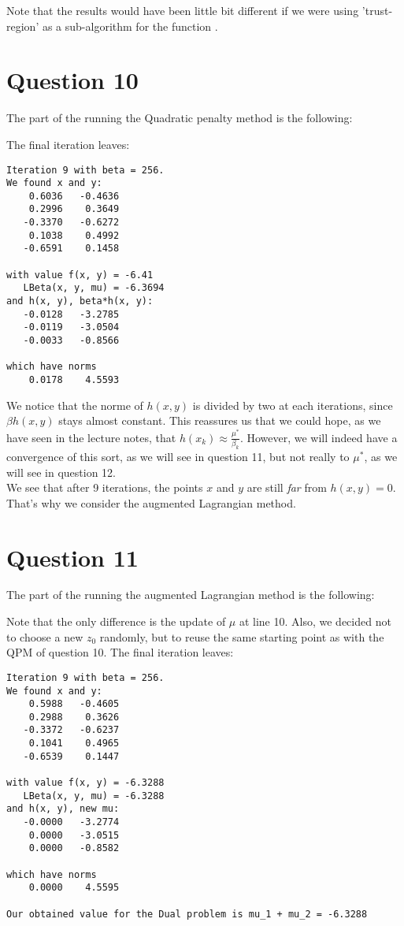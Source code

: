 \documentclass{article}
\begin{document}
Note that the results would have been little bit different if we were using 'trust-region' as a sub-algorithm for the function .


\section*{Question 10}
The part of the  running the Quadratic penalty method is the following:


The final iteration leaves:
\begin{lstlisting}
Iteration 9 with beta = 256.
We found x and y:
    0.6036   -0.4636
    0.2996    0.3649
   -0.3370   -0.6272
    0.1038    0.4992
   -0.6591    0.1458

with value f(x, y) = -6.41
   LBeta(x, y, mu) = -6.3694
and h(x, y), beta*h(x, y):
   -0.0128   -3.2785
   -0.0119   -3.0504
   -0.0033   -0.8566

which have norms
    0.0178    4.5593
\end{lstlisting}

We notice that the norme of $h(x, y)$ is divided by two at each iterations, since $\beta h(x, y)$ stays almost constant.
This reassures us that we could hope, as we have seen in the lecture notes, that $h(x_k) \approx \frac{\mu^*}{\beta_k}$. However, we will indeed have a convergence of this sort, as we will see in question 11, but not really to $\mu^*$, as we will see in question 12.\\
We see that after 9 iterations, the points $x$ and $y$ are still \textit{far} from $h(x, y) = 0$. That's why we consider the augmented Lagrangian method.


\section*{Question 11}
The part of the  running the augmented Lagrangian method is the following:


Note that the only difference is the update of $\mu$ at line 10. Also, we decided not to choose a new $z_0$ randomly, but to reuse the same starting point as with the QPM of question 10.
The final iteration leaves:
\begin{lstlisting}
Iteration 9 with beta = 256.
We found x and y:
    0.5988   -0.4605
    0.2988    0.3626
   -0.3372   -0.6237
    0.1041    0.4965
   -0.6539    0.1447

with value f(x, y) = -6.3288
   LBeta(x, y, mu) = -6.3288
and h(x, y), new mu:
   -0.0000   -3.2774
    0.0000   -3.0515
    0.0000   -0.8582

which have norms
    0.0000    4.5595

Our obtained value for the Dual problem is mu_1 + mu_2 = -6.3288
\end{lstlisting}
\end{document}
